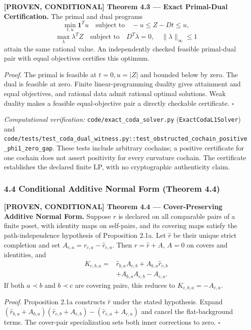 \documentclass[
  english,
  10pt,
  a4paper,
]{article}
\renewenvironment{quote}
  {\begin{leftbar}\small}
  {\end{leftbar}}
\begin{document}
\begin{quote}
\textbf{{[}PROVEN, CONDITIONAL{]} Theorem 4.3 --- Exact Primal-Dual
Certification.} The primal and dual programs \[
\min_{t,u}\mathbf{1}^Tu\quad\text{subject to}\quad -u\le Z-Dt\le u,
\] \[
\max_\lambda\lambda^TZ\quad\text{subject to}\quad D^T\lambda=0,\quad\|\lambda\|_\infty\le1
\] attain the same rational value. An independently checked feasible
primal-dual pair with equal objectives certifies this optimum.

\emph{Proof.} The primal is feasible at \(t=0,u=|Z|\) and bounded below
by zero. The dual is feasible at zero. Finite linear-programming duality
gives attainment and equal objectives, and rational data admit rational
optimal solutions. Weak duality makes a feasible equal-objective pair a
directly checkable certificate. \(\square\)
\end{quote}

\emph{Computational verification:} \nolinkurl{code/exact_coda_solver.py}
(\texttt{ExactCodaL1Solver}) and
\nolinkurl{code/tests/test_coda_dual_witness.py::test_obstructed_cochain_positive_phi1_zero_gap}.
These tests include arbitrary cochains; a positive certificate for one
cochain does not assert positivity for every curvature cochain. The
certificate establishes the declared finite LP, with no cryptographic
authenticity claim.

\subsubsection{4.4 Conditional Additive Normal Form (Theorem
4.4)}\label{conditional-additive-normal-form-theorem-4.4}

\begin{quote}
\textbf{{[}PROVEN, CONDITIONAL{]} Theorem 4.4 --- Cover-Preserving
Additive Normal Form.} Suppose \(r\) is declared on all comparable pairs
of a finite poset, with identity maps on self-pairs, and its covering
maps satisfy the path-independence hypothesis of Proposition 2.1a. Let
\(\widehat r\) be their unique strict completion and set
\(A_{c,a}=r_{c,a}-\widehat r_{c,a}\). Then \(r=\widehat r+A\), \(A=0\)
on covers and identities, and \[
\begin{aligned}
K_{c,b,a}={}&\widehat r_{b,a}A_{c,b}+A_{b,a}\widehat r_{c,b}\\
&+A_{b,a}A_{c,b}-A_{c,a}.
\end{aligned}
\] If both \(a\prec b\) and \(b\prec c\) are covering pairs, this
reduces to \(K_{c,b,a}=-A_{c,a}\).

\emph{Proof.} Proposition 2.1a constructs \(\widehat r\) under the
stated hypothesis. Expand
\((\widehat r_{b,a}+A_{b,a})(\widehat r_{c,b}+A_{c,b})-(\widehat r_{c,a}+A_{c,a})\)
and cancel the flat-background terms. The cover-pair specialization sets
both inner corrections to zero. \(\square\)
\end{quote}
\end{document}
